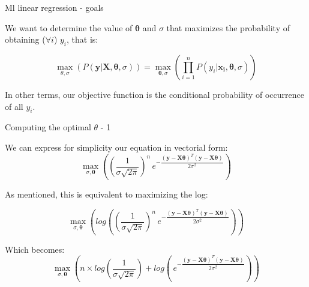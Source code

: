 \documentclass{beamer}
\begin{document}
\begin{frame}
{\centerline{Ml linear regression - goals}}

We want to determine the value of $\boldsymbol{\theta}$ and $\sigma$ that maximizes the probability of obtaining ($\forall i$) $y_i$, that is:

$$ \max_{\theta, \sigma}( P(\mathbf{y} | \boldsymbol{X}, \boldsymbol{\theta}, \sigma)) = \max_{\boldsymbol{\theta}, \sigma}(\prod_{i=1}^n P(y_i | \boldsymbol{x_i}, \boldsymbol{\theta}, \sigma)) $$


\vspace*{0.5cm}
In other terms, our objective function is the conditional probability of occurrence of all $y_i$.


\end{frame}

\begin{frame}
{\centerline{Computing the optimal $\theta$ - 1}}
We can express for simplicity our equation in vectorial form:
$$\max_{\sigma, \boldsymbol{\theta}}\left ( \left (\dfrac 1 {\sigma \sqrt{2 \pi} } \right)^n \, e^{-\dfrac { (\boldsymbol{y} - \boldsymbol{X\theta})^T (\boldsymbol{y} - \boldsymbol{X\theta})} {2 \sigma^2} }\right)$$

As mentioned, this is equivalent to maximizing the log:

$$\max_{\sigma, \boldsymbol{\theta}} \left( log \left (\left (\dfrac 1 {\sigma \sqrt{2 \pi} } \right )^n \, e^{-\dfrac { (\boldsymbol{y} - \boldsymbol{X\theta})^T (\boldsymbol{y} - \boldsymbol{X\theta})} {2 \sigma^2} }\right) \right )$$

Which becomes:
$$\max_{\sigma, \boldsymbol{\theta}} \left( n \times log \left (\dfrac 1 {\sigma \sqrt{2 \pi} } \right ) + log \left( \, e^{-\dfrac { (\boldsymbol{y} - \boldsymbol{X\theta})^T (\boldsymbol{y} - \boldsymbol{X\theta})} {2 \sigma^2} }\right) \right )$$

\end{frame}
\end{document}
